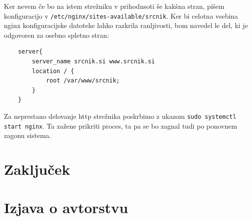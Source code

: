 \documentclass[12pt, a4paper]{article}
\begin{document}
Ker nevem če bo na istem strežniku v prihodnsoti še kakšna stran, pišem konfiguracijo v \verb|/etc/nginx/sites-available/srcnik|.
Ker bi celotna vsebina nginx konfiguracijske datoteke lahko razkrila ranljivosti, bom navedel le del, ki je odgovoren za osebno spletno stran:
\begin{lstlisting}
	server{
		server_name srcnik.si www.srcnik.si
		location / {
			root /var/www/srcnik;
		}
	}
\end{lstlisting}
Za neprestano delovanje http strežnika poskrbimo z ukazom \verb|sudo systemctl start nginx|.
Ta zažene prikriti proces, ta pa se bo zagnal tudi po ponovnem zagonu sistema.

\section{Zaključek}


\section*{Izjava o avtorstvu}
\end{document}
